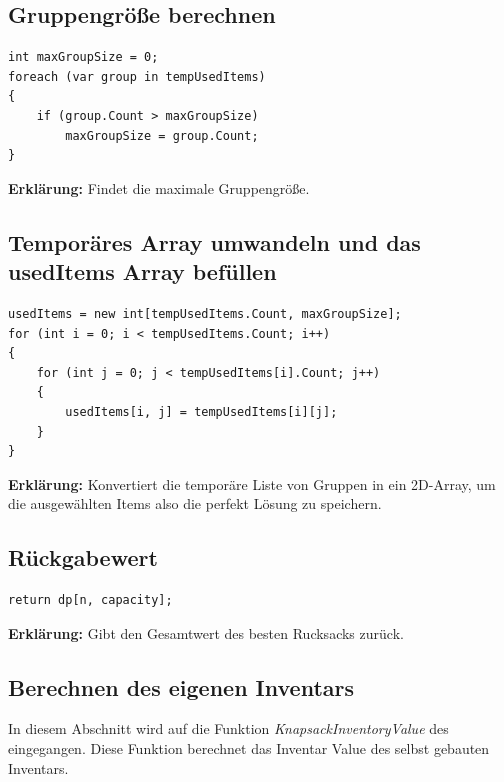 \subsection*{Gruppengröße berechnen}
\begin{lstlisting}[style=csharp, caption={}, label=code:maxgroup]
int maxGroupSize = 0;
foreach (var group in tempUsedItems)
{
    if (group.Count > maxGroupSize)
        maxGroupSize = group.Count;
}
\end{lstlisting}
\textbf{Erklärung:} Findet die maximale Gruppengröße.\\

\subsection*{Temporäres Array umwandeln und das usedItems Array befüllen}
\begin{lstlisting}[style=csharp, caption={}, label=code:convert]
usedItems = new int[tempUsedItems.Count, maxGroupSize];
for (int i = 0; i < tempUsedItems.Count; i++)
{
    for (int j = 0; j < tempUsedItems[i].Count; j++)
    {
        usedItems[i, j] = tempUsedItems[i][j];
    }
}
\end{lstlisting}
\textbf{Erklärung:} Konvertiert die temporäre Liste von Gruppen in ein 2D-Array, um die ausgewählten Items also die perfekt Lösung zu speichern.\\

\subsection*{Rückgabewert}
\begin{lstlisting}[style=csharp, caption={}, label=code:return]
return dp[n, capacity];
\end{lstlisting}
\textbf{Erklärung:} Gibt den Gesamtwert des besten Rucksacks zurück.\\

\subsection{Berechnen des eigenen Inventars}
In diesem Abschnitt wird auf die Funktion \textit{KnapsackInventoryValue} des  eingegangen. Diese Funktion
berechnet das Inventar Value des selbst gebauten Inventars.

